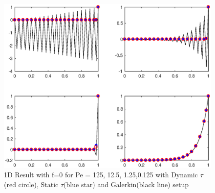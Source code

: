 \documentclass[10pt]{article}
\begin{document}
\begin{figure}[h!]
	\begin{center}
	\includegraphics[width=1.0\textwidth, clip]{./figure/feq0.eps}
	\end{center}
		\vspace{0mm}
    \caption{1D Result with f=0 for Pe = 125, 12.5, 1.25,0.125 with Dynamic $\tau$ (red circle), Static $\tau$(blue star) and Galerkin(black line) setup}
  	\label{feq0}
\end{figure}
\end{document}
